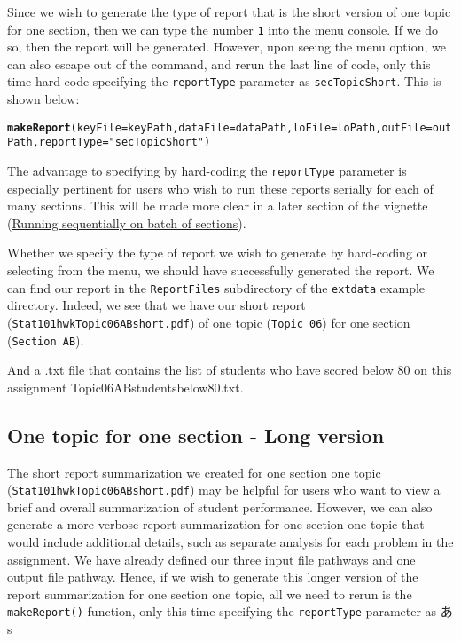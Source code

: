\documentclass{article}\usepackage[]{graphicx}\usepackage[]{color}
\makeatletter
\newcommand{\hlstr}[1]{\textcolor[rgb]{0.192,0.494,0.8}{#1}}%
\newcommand{\hlstd}[1]{\textcolor[rgb]{0.345,0.345,0.345}{#1}}%
\newcommand{\hlkwc}[1]{\textcolor[rgb]{0.333,0.667,0.333}{#1}}%
\newcommand{\hlkwd}[1]{\textcolor[rgb]{0.737,0.353,0.396}{\textbf{#1}}}%
\newenvironment{kframe}{%
 \def\at@end@of@kframe{}%
 \ifinner\ifhmode%
  \def\at@end@of@kframe{\end{minipage}}%
  \begin{minipage}{\columnwidth}%
 \fi\fi%
 \def\FrameCommand##1{\hskip\@totalleftmargin \hskip-\fboxsep
 \colorbox{shadecolor}{##1}\hskip-\fboxsep
     \hskip-\linewidth \hskip-\@totalleftmargin \hskip\columnwidth}%
 \MakeFramed {\advance\hsize-\width
   \@totalleftmargin\z@ \linewidth\hsize
   \@setminipage}}%
 {\par\unskip\endMakeFramed%
 \at@end@of@kframe}
\newenvironment{knitrout}{}{} %
\numberwithin{equation}{section} %
\makeatother
\begin{document}
Since we wish to generate the type of report that is the short version of one topic for one section, then we can type the number \texttt{1} into the menu console. If we do so, then the report will be generated. However, upon seeing the menu option, we can also escape out of the command, and rerun the last line of code, only this time hard-code specifying the \texttt{reportType} parameter as \texttt{secTopicShort}. This is shown below:

\begin{knitrout}
\color{fgcolor}\begin{kframe}
\begin{alltt}
\hlkwd{makeReport}\hlstd{(}\hlkwc{keyFile}\hlstd{=keyPath,} \hlkwc{dataFile}\hlstd{=dataPath,} \hlkwc{loFile}\hlstd{=loPath,} \hlkwc{outFile}\hlstd{=outPath,} \hlkwc{reportType} \hlstd{=} \hlstr{"secTopicShort"}\hlstd{)}
\end{alltt}
\end{kframe}
\end{knitrout}

The advantage to specifying by hard-coding the \texttt{reportType} parameter is especially pertinent for users who wish to run these reports serially for each of many sections. This will be made more clear in a later section of the vignette (\hyperref[sec:sequential]{Running sequentially on batch of sections}).

Whether we specify the type of report we wish to generate by hard-coding or selecting from the menu, we should have successfully generated the report. We can find our report in the \texttt{ReportFiles} subdirectory of the \texttt{extdata} example directory. Indeed, we see that we have our short report (\texttt{Stat101hwkTopic06ABshort.pdf}) of one topic (\texttt{Topic 06}) for one section (\texttt{Section AB}).

And a .txt file that contains the list of students who have scored below 80 on this assignment {Topic06ABstudentsbelow80.txt}.

\subsection{One topic for one section - Long version}

The short report summarization we created for one section one topic (\texttt{Stat101hwkTopic06ABshort.pdf}) may be helpful for users who want to view a brief and overall summarization of student performance. However, we can also generate a more verbose report summarization for one section one topic that would include additional details, such as separate analysis for each problem in the assignment. We have already defined our three input file pathways and one output file pathway. Hence, if we wish to generate this longer version of the report summarization for one section one topic, all we need to rerun is the \texttt{makeReport()} function, only this time specifying the \texttt{reportType} parameter as あs
\end{document}
